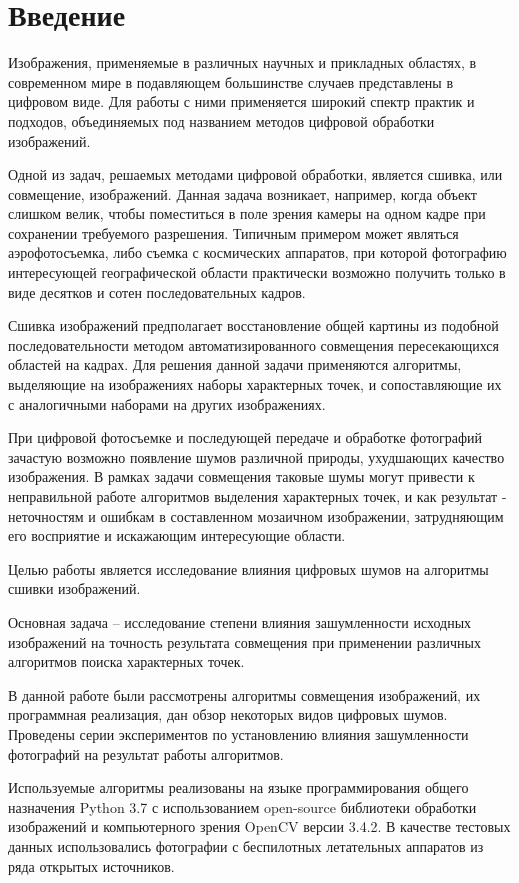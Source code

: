 \newpage
\tableofcontents


\newpage
{}
{}
\section*{Введение}
{
	Изображения, применяемые в различных научных и прикладных областях, в современном мире в подавляющем большинстве случаев представлены в цифровом виде. Для работы с ними применяется широкий спектр практик и подходов, объединяемых под названием методов цифровой обработки изображений. 
	
	Одной из задач, решаемых методами цифровой обработки, является сшивка, или совмещение, изображений. Данная задача возникает, например, когда объект слишком велик, чтобы поместиться в поле зрения камеры на одном кадре при сохранении требуемого разрешения. Типичным примером может являться аэрофотосъемка, либо съемка с космических аппаратов, при которой фотографию интересующей географической области практически возможно получить только в виде десятков и сотен последовательных кадров.   
	
	Сшивка изображений предполагает восстановление общей картины из подобной последовательности методом автоматизированного совмещения пересекающихся областей на кадрах. Для решения данной задачи применяются алгоритмы, выделяющие на изображениях наборы характерных точек, и сопоставляющие их с аналогичными наборами на других изображениях.

	При цифровой фотосъемке и последующей передаче и обработке фотографий зачастую возможно появление шумов различной природы, ухудшающих качество изображения. В рамках задачи совмещения таковые шумы могут привести к неправильной работе алгоритмов выделения характерных точек, и как результат - неточностям и ошибкам в составленном мозаичном изображении, затрудняющим его восприятие и искажающим интересующие области. 
	
	Целью работы является исследование влияния цифровых шумов на алгоритмы сшивки изображений.
	
	Основная задача -- исследование степени влияния зашумленности исходных изображений на точность результата совмещения при применении различных алгоритмов поиска характерных точек.
	
	В данной работе были рассмотрены алгоритмы совмещения изображений, их программная реализация, дан обзор некоторых видов цифровых шумов. Проведены серии экспериментов по установлению влияния зашумленности фотографий на результат работы алгоритмов.  
	
	Используемые алгоритмы реализованы на языке программирования общего назначения Python 3.7 с использованием open-source библиотеки обработки изображений и компьютерного зрения OpenCV версии 3.4.2. В качестве тестовых данных использовались фотографии с беспилотных летательных аппаратов из ряда открытых источников.
}

